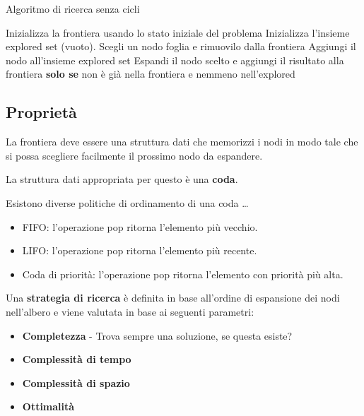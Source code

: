 \begin{algorithm}
    \caption{Algoritmo di ricerca senza cicli}
    \label{alg:search2}
    \begin{algorithmic}[1] %
         
			\State Inizializza la frontiera usando lo stato iniziale del problema
			\State Inizializza l'insieme explored set (vuoto).
            \Loop
              \EndIf
            \State Scegli un nodo foglia e rimuovilo dalla frontiera
              \EndIf
			\State Aggiungi il nodo all'insieme explored set
            \State Espandi il nodo scelto e aggiungi il risultato alla
frontiera \textbf{solo se} non è già nella frontiera e nemmeno nell'explored 
			\EndLoop
        \EndProcedure
    \end{algorithmic}
\end{algorithm}

\subsection{Proprietà}

La frontiera deve essere una struttura dati che memorizzi i nodi in modo tale
che si possa scegliere facilmente il prossimo nodo da espandere.

La struttura dati appropriata per questo è una \textbf{coda}.

Esistono diverse politiche di ordinamento di una coda \dots

\begin{itemize}
\item FIFO: l'operazione pop ritorna l'elemento più vecchio.
\item LIFO: l'operazione pop ritorna l'elemento più recente.
\item Coda di priorità: l'operazione pop ritorna l'elemento con priorità più alta.
\end{itemize}

Una \textbf{strategia di ricerca} è definita in base all'ordine di espansione
dei nodi nell'albero e viene valutata in base ai seguenti parametri:

\begin{itemize}
\item \textbf{Completezza} - Trova sempre una soluzione, se questa esiste?
\item \textbf{Complessità di tempo}
\item \textbf{Complessità di spazio}
\item \textbf{Ottimalità}
\end{itemize}

